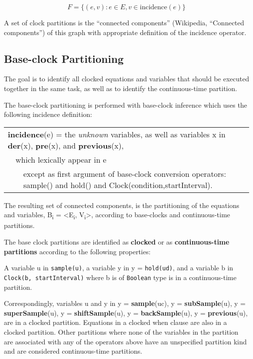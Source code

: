 $$F = \{(e, v) : e \in E , v \in \text{incidence}(e)\}$$

A set of clock partitions is the ``connected components'' (Wikipedia,
``Connected components'') of this graph with appropriate definition of
the incidence operator.

\subsection{Base-clock Partitioning}

The goal is to identify all clocked equations and variables that should
be executed together in the same task, as well as to identify the
continuous-time partition.

The base-clock partitioning is performed with base-clock inference which
uses the following incidence definition:

\begin{tabular}{p{1cm}p{1cm}p{1cm}p{12cm}}
\multicolumn{4}{p{15cm}}{\textbf{incidence}(e) = the \emph{unknown} variables, as well as
variables x in \textbf{der}(x), \textbf{pre}(x), and \textbf{previous}(x),}\\
&\multicolumn{3}{p{14cm}}{which lexically appear in e}\\
&&\multicolumn{2}{p{13cm}}{except as first argument of base-clock conversion operators: sample() and hold() and Clock(condition,startInterval).}
\end{tabular}

The resulting set of connected components, is the partitioning of the
equations and variables, B\textsubscript{i} =
\textless{}E\textsubscript{i}, V\textsubscript{i}\textgreater{},
according to base-clocks and continuous-time partitions.

The base clock partitions are identified as \textbf{clocked} or as
\textbf{continuous-time partitions} according to the following
properties:

A variable u in \lstinline!sample(u)!, a variable y in y =
\lstinline!hold(ud)!, and a variable b in \lstinline!Clock(b, startInterval)! where b is of \lstinline!Boolean! type is in a continuous-time partition.

Correspondingly, variables u and y in y = \textbf{sample}(uc), y =
\textbf{subSample}(u), y = \textbf{superSample}(u), y =
\textbf{shiftSample}(u), y = \textbf{backSample}(u), y =
\textbf{previous}(u), are in a clocked partition. Equations in a clocked
when clause are also in a clocked partition.
Other partitions where none of the variables in the partition are
associated with any of the operators above have an unspecified partition
kind and are considered continuous-time partitions.

